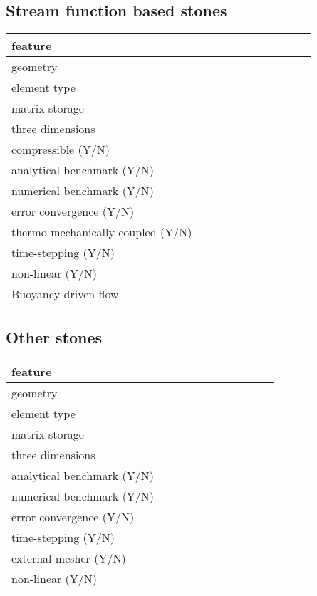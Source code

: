 \begin{landscape}
\subsection{Stream function based stones}

\noindent 
{\scriptsize
\begin{tabular}{|l|p{1.5cm}|p{1.5cm}|p{1.5cm}|p{1.5cm}|p{1.5cm}|p{1.5cm}|p{1.5cm}|p{1.5cm}|p{1.5cm}|p{1.5cm}|} 
\hline
feature & &&&&&&&&& \\ 
\hline
geometry &  &&&&&&&&& \\
element type &&&&&&&&&\\ 
matrix storage & & &&&&&&&& \\
\hline
three dimensions &  &&&&&&&&& \\
compressible (Y/N) &&&&&&&&&& \\
analytical benchmark (Y/N) &&&&&&&&&& \\
numerical benchmark (Y/N) &  &&&&&&&&& \\
error convergence (Y/N) & &&&&&&&&& \\
thermo-mechanically coupled (Y/N) &&&&&&&&&& \\
time-stepping (Y/N) &&&&&&&&&& \\
non-linear (Y/N) &&&&&&&&&& \\
Buoyancy driven flow & &  &&&&&&&\\
\hline
\end{tabular}
}







\subsection{Other stones}

\noindent 
{\scriptsize
\begin{tabular}{|l|p{1.5cm}|p{1.5cm}|p{1.5cm}|p{1.5cm}|p{1.5cm}|p{1.5cm}|p{1.5cm}|p{1.5cm}|p{1.5cm}|p{1.5cm}|} 
\hline
feature & &&&&&&&&& \\ 
\hline
geometry &  &&&&&&&&& \\
element type &&&&&&&&&\\ 
matrix storage & & &&&&&&&& \\
\hline
three dimensions &  &&&&&&&&& \\
analytical benchmark (Y/N) &&&&&&&&&& \\
numerical benchmark (Y/N) &  &&&&&&&&& \\
error convergence (Y/N) & &&&&&&&&& \\
time-stepping (Y/N) &&&&&&&&&& \\
external mesher (Y/N) &&&&&&&&&& \\
non-linear (Y/N) &&&&&&&&&& \\
\hline
\end{tabular}
}













\end{landscape}
